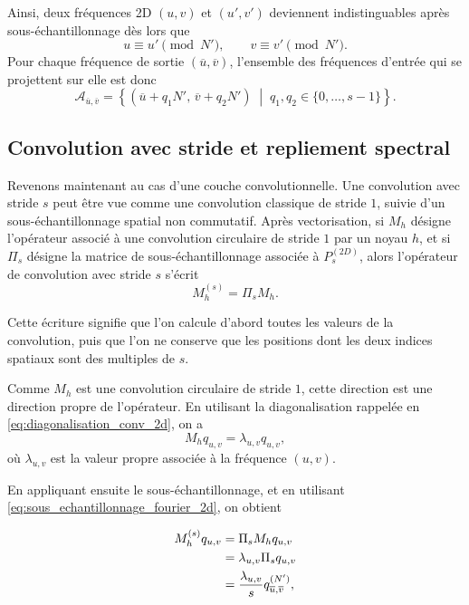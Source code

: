 Ainsi, deux fréquences 2D $(u,v)$ et $(u',v')$ deviennent indistinguables après sous-échantillonnage
dès lors que
\[
    u \equiv u' \pmod{N'},
    \qquad
    v \equiv v' \pmod{N'}.
\]
Pour chaque fréquence de sortie $(\overline{u},\overline{v})$, l'ensemble des fréquences d'entrée qui
se projettent sur elle est donc
\begin{equation}
    \mathcal{A}_{\overline{u},\overline{v}}
    =
    \left\{
        (\overline{u}+q_1N',\,\overline{v}+q_2N')
        \;\middle|\;
        q_1,q_2 \in \{0,\dots,s-1\}
    \right\}.
    \label{eq:classe_aliasing_2d}
\end{equation}

\subsection{Convolution avec stride et repliement spectral}

Revenons maintenant au cas d'une couche convolutionnelle. Une convolution avec stride $s$ peut être vue
comme une convolution classique de stride $1$, suivie d'un sous-échantillonnage spatial non commutatif. Après vectorisation,
si $M_h$ désigne l'opérateur associé à une convolution circulaire de stride $1$ par un noyau $h$, et si
$\Pi_s$ désigne la matrice de sous-échantillonnage associée à $P_s^{(2D)}$, alors l'opérateur de convolution
avec stride $s$ s'écrit
\begin{equation}
    M_h^{(s)}
    =
    \Pi_s M_h.
    \label{eq:conv_stride_sampling}
\end{equation}

Cette écriture signifie que l'on calcule d'abord toutes les valeurs de la convolution, puis que l'on ne conserve
que les positions dont les deux indices spatiaux sont des multiples de $s$.

Comme $M_h$ est une convolution circulaire de stride $1$, cette direction est une direction propre de
l'opérateur. En utilisant la diagonalisation rappelée en \eqref{eq:diagonalisation_conv_2d}, on a
\[
    M_h q_{u,v}
    =
    \lambda_{u,v} q_{u,v},
\]
où $\lambda_{u,v}$ est la valeur propre associée à la fréquence $(u,v)$.

En appliquant ensuite le sous-échantillonnage, et en utilisant
\eqref{eq:sous_echantillonnage_fourier_2d}, on obtient

\begin{align}
    M_h^{(s)} q_{u,v}
    &=
    \Pi_s M_h q_{u,v} \notag \\
    &=
    \lambda_{u,v}\Pi_s q_{u,v} \notag \\
    &=
    \frac{\lambda_{u,v}}{s}
    q_{\overline{u},\overline{v}}^{(N')},
    \label{eq:action_conv_stride_fourier}
\end{align}

